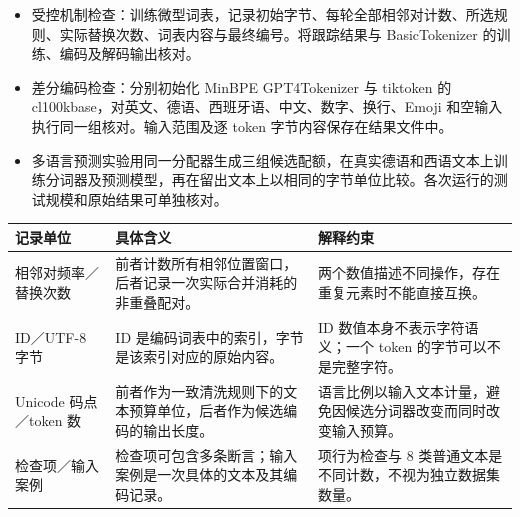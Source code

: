 \documentclass[11pt,a4paper]{article}
\newlength{\BpeDocTableWidth}
\newcommand{\BpeDocCodeInline}[1]{{\ttfamily #1}}
\begin{document}
\begin{itemize}

\item 受控机制检查：训练微型词表，记录初始字节、每轮全部相邻对计数、所选规则、实际替换次数、词表内容与最终编号。将跟踪结果与 \BpeDocCodeInline{BasicTokenizer} 的训练、编码及解码输出核对。

\item 差分编码检查：分别初始化 MinBPE \BpeDocCodeInline{GPT4Tokenizer} 与 tiktoken 的 \BpeDocCodeInline{cl100k\relax\allowbreak{}base}，对英文、德语、西班牙语、中文、数字、换行、Emoji 和空输入执行同一组核对。输入范围及逐 \BpeDocCodeInline{token} 字节内容保存在结果文件中。

\item 多语言预测实验用同一分配器生成三组候选配额，在真实德语和西语文本上训练分词器及预测模型，再在留出文本上以相同的字节单位比较。各次运行的测试规模和原始结果可单独核对。

\end{itemize}



\begingroup\fontsize{9.3}{12.7}\selectfont{}
\setlength{\BpeDocTableWidth}{\dimexpr\linewidth-6\tabcolsep\relax}
\renewcommand{\arraystretch}{1.15}
\par\addvspace{0.45em}
\noindent\begin{minipage}{\linewidth}
\begin{tabular}{>{\raggedright\arraybackslash}p{0.230000\BpeDocTableWidth}>{\raggedright\arraybackslash}p{0.400000\BpeDocTableWidth}>{\raggedright\arraybackslash}p{0.370000\BpeDocTableWidth}}
\toprule
\textbf{记录单位} & \textbf{具体含义} & \textbf{解释约束} \\

\midrule
相邻对频率／替换次数 & 前者计数所有相邻位置窗口，后者记录一次实际合并消耗的非重叠配对。 & 两个数值描述不同操作，存在重复元素时不能直接互换。 \\[3pt]
\BpeDocCodeInline{token} ID／UTF-8 字节 & ID 是编码词表中的索引，字节是该索引对应的原始内容。 & ID 数值本身不表示字符语义；一个 \BpeDocCodeInline{token} 的字节可以不是完整字符。 \\[3pt]
Unicode 码点／\BpeDocCodeInline{token} 数 & 前者作为一致清洗规则下的文本预算单位，后者作为候选编码的输出长度。 & 语言比例以输入文本计量，避免因候选分词器改变而同时改变输入预算。 \\[3pt]
检查项／输入案例 & 检查项可包含多条断言；输入案例是一次具体的文本及其编码记录。 & 17 项行为检查与 8 类普通文本是不同计数，不视为独立数据集数量。 \\[3pt]
\bottomrule
\end{tabular}
\end{minipage}\par\addvspace{0.65em}
\endgroup
\end{document}
